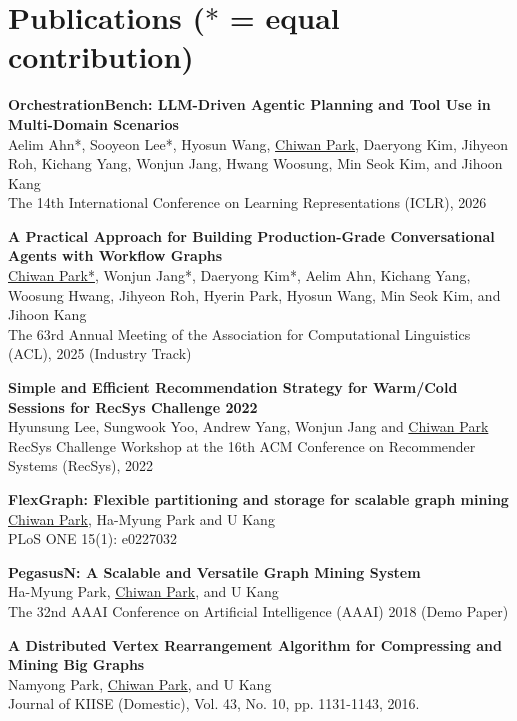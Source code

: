 \documentclass[11pt,a4paper]{article}
\newenvironment{entry}{
  \begin{list}{}{
    \setlength{\leftmargin}{0em}
    \setlength{\itemsep}{0.25em}
    \setlength{\parskip}{0pt}
    \setlength{\parsep}{0.25em}
  }
}{
  \end{list}
}
\begin{document}
\section*{Publications {\scriptsize ($\ast$ = equal contribution)}}
\begin{entry}
  \item \textbf{OrchestrationBench: LLM-Driven Agentic Planning and Tool Use in Multi-Domain Scenarios}\\
  Aelim Ahn*, Sooyeon Lee*, Hyosun Wang, \underline{Chiwan Park}, Daeryong Kim, Jihyeon Roh, Kichang Yang, Wonjun Jang, Hwang Woosung, Min Seok Kim, and Jihoon Kang\\
  The 14th International Conference on Learning Representations (ICLR), 2026
  \item \textbf{A Practical Approach for Building Production-Grade Conversational Agents with Workflow Graphs}\\
  \underline{Chiwan Park*}, Wonjun Jang*, Daeryong Kim*, Aelim Ahn, Kichang Yang, Woosung Hwang, Jihyeon Roh, Hyerin Park, Hyosun Wang, Min Seok Kim, and Jihoon Kang\\
  The 63rd Annual Meeting of the Association for Computational Linguistics (ACL), 2025 (Industry Track)
  \item \textbf{Simple and Efficient Recommendation Strategy for Warm/Cold Sessions for RecSys Challenge 2022}\\
  Hyunsung Lee, Sungwook Yoo, Andrew Yang, Wonjun Jang and \underline{Chiwan Park}\\
  RecSys Challenge Workshop at the 16th ACM Conference on Recommender Systems (RecSys), 2022
  \item \textbf{FlexGraph: Flexible partitioning and storage for scalable graph mining}\\
  \underline{Chiwan Park}, Ha-Myung Park and U Kang\\
  PLoS ONE 15(1): e0227032
  \item \textbf{PegasusN: A Scalable and Versatile Graph Mining System}\\
  Ha-Myung Park, \underline{Chiwan Park}, and U Kang\\
  The 32nd AAAI Conference on Artificial Intelligence (AAAI) 2018 (Demo Paper)
  \item \textbf{A Distributed Vertex Rearrangement Algorithm for Compressing and Mining Big Graphs}\\
  Namyong Park, \underline{Chiwan Park}, and U Kang\\
  Journal of KIISE (Domestic), Vol. 43, No. 10, pp. 1131-1143, 2016.
\end{entry}
\end{document}
